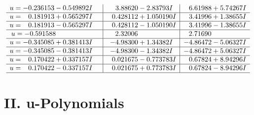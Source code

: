 \documentclass[1p]{elsarticle_modified}
\theoremstyle{definition}
\begin{document}
$$\begin{array}{c|c|c}
\begin{aligned}
u &= -0.236153 - 0.549892 I\end{aligned}
 & \phantom{-}3.88620 - 2.83793 I & \phantom{-}6.61988 + 5.74267 I \\ \hline\begin{aligned}
u &= \phantom{-}0.181913 + 0.565297 I\end{aligned}
 & \phantom{-}0.428112 + 1.050190 I & \phantom{-}3.41996 + 1.38655 I \\ \hline\begin{aligned}
u &= \phantom{-}0.181913 - 0.565297 I\end{aligned}
 & \phantom{-}0.428112 - 1.050190 I & \phantom{-}3.41996 - 1.38655 I \\ \hline\begin{aligned}
u &= -0.591588\phantom{ +0.000000I}\end{aligned}
 & \phantom{-}2.32006\phantom{ +0.000000I} & \phantom{-}2.71690\phantom{ +0.000000I} \\ \hline\begin{aligned}
u &= -0.345085 + 0.381413 I\end{aligned}
 & -4.98300 + 1.34382 I & -4.86472 - 5.06327 I \\ \hline\begin{aligned}
u &= -0.345085 - 0.381413 I\end{aligned}
 & -4.98300 - 1.34382 I & -4.86472 + 5.06327 I \\ \hline\begin{aligned}
u &= \phantom{-}0.170422 + 0.337157 I\end{aligned}
 & \phantom{-}0.021675 - 0.773783 I & \phantom{-}0.67824 + 8.94296 I \\ \hline\begin{aligned}
u &= \phantom{-}0.170422 - 0.337157 I\end{aligned}
 & \phantom{-}0.021675 + 0.773783 I & \phantom{-}0.67824 - 8.94296 I\\
 \hline 
 \end{array}$$\newpage
\newpage\renewcommand{\arraystretch}{1}
\centering \section*{ II. u-Polynomials}
\end{document}

